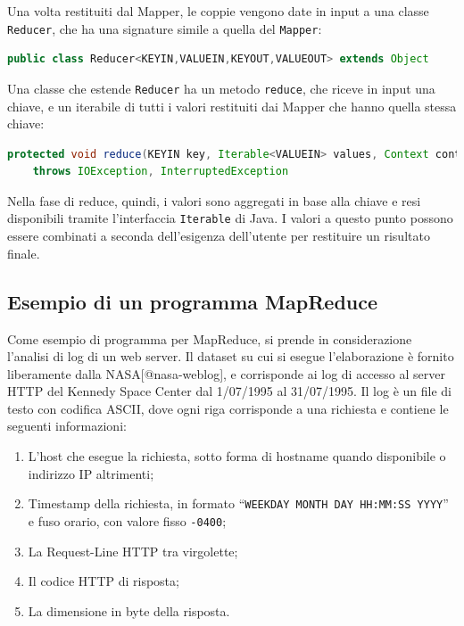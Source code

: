 \documentclass[italian,a4paper, twoside, 12pt]{report}
\providecommand{\tightlist}{%
  \setlength{\itemsep}{0pt}\setlength{\parskip}{0pt}}
\begin{document}
Una volta restituiti dal Mapper, le coppie vengono date in input a una
classe \lstinline!Reducer!, che ha una signature simile a quella del
\lstinline!Mapper!:

\begin{lstlisting}[language=Java]
public class Reducer<KEYIN,VALUEIN,KEYOUT,VALUEOUT> extends Object
\end{lstlisting}

Una classe che estende \lstinline!Reducer! ha un metodo
\lstinline!reduce!, che riceve in input una chiave, e un iterabile di
tutti i valori restituiti dai Mapper che hanno quella stessa chiave:

\begin{lstlisting}[language=Java]
protected void reduce(KEYIN key, Iterable<VALUEIN> values, Context context) 
    throws IOException, InterruptedException
\end{lstlisting}

Nella fase di reduce, quindi, i valori sono aggregati in base alla
chiave e resi disponibili tramite l'interfaccia \lstinline!Iterable! di
Java. I valori a questo punto possono essere combinati a seconda
dell'esigenza dell'utente per restituire un risultato finale.

\subsection{Esempio di un programma
MapReduce}\label{esempio-di-un-programma-mapreduce}

Come esempio di programma per MapReduce, si prende in considerazione
l'analisi di log di un web server. Il dataset su cui si esegue
l'elaborazione è fornito liberamente dalla NASA{[}@nasa-weblog{]}, e
corrisponde ai log di accesso al server HTTP del Kennedy Space Center
dal 1/07/1995 al 31/07/1995. Il log è un file di testo con codifica
ASCII, dove ogni riga corrisponde a una richiesta e contiene le seguenti
informazioni:

\begin{enumerate}
\tightlist
\item
  L'host che esegue la richiesta, sotto forma di hostname quando
  disponibile o indirizzo IP altrimenti;
\item
  Timestamp della richiesta, in formato
  ``\lstinline!WEEKDAY MONTH DAY HH:MM:SS YYYY!'' e fuso orario, con
  valore fisso \lstinline!-0400!;
\item
  La Request-Line HTTP tra virgolette;
\item
  Il codice HTTP di risposta;
\item
  La dimensione in byte della risposta.
\end{enumerate}
\end{document}
